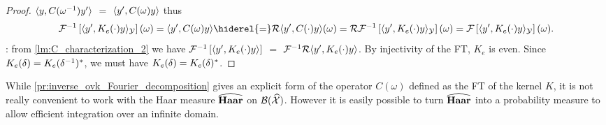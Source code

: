 \begin{proof}
    $\langle y, C({\omega}^{-1})y'\rangle$ $=$ $\langle y', C(\omega)y\rangle$ thus
    \begin{dmath*}
        \IFT{\inner{y', K_e(\cdot)y}_{\mathcal{Y}}}(\omega)=\inner{y',
        C(\omega)y}\hiderel{=}\mathcal{R}\inner{y',
        C(\cdot)y}(\omega)=\mathcal{R}\IFT{\inner{y',
        K_e(\cdot)y}_{\mathcal{Y}}}(\omega)=\FT{\inner{y',
        K_e(\cdot)y}_{\mathcal{Y}}}(\omega).
    \end{dmath*}
    : from \cref{lm:C_characterization_2} we have
    $\mathcal{F}^{-1}\left[\langle y', K_e(\cdot)y\rangle\right]$ $=$ $\mathcal{F}^{-1}\mathcal{R}{\langle y',
    K_e(\cdot)y\rangle}$. By injectivity of the \acl{FT}, $K_e$ is even. Since
    $K_e(\delta)=K_e({\delta}^{-1})^* $, we must have
    $K_e(\delta)=K_e(\delta)^* $.
\end{proof}
While \cref{pr:inverse_ovk_Fourier_decomposition} gives an explicit form of the
operator $C(\omega)$ defined as the \acl{FT} of the kernel $K$, it is not
really convenient to work with the Haar measure $\widehat{\mathbf{Haar}}$ on
$\mathcal{B}(\widehat{\mathcal{X}})$. However it is easily possible to turn
$\widehat{\mathbf{Haar}}$ into a probability measure to allow efficient integration over
an infinite domain.
